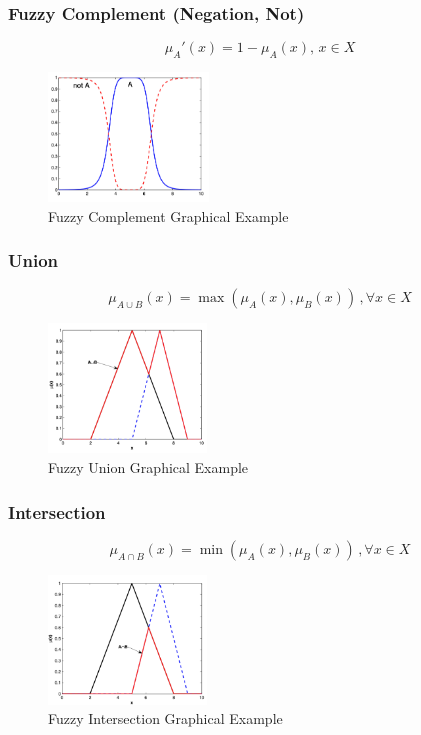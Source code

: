 \documentclass{tron}
\begin{document}
\subsubsection{Fuzzy Complement (Negation, Not)}
\begin{equation}
	\mu_A'(x) = 1 - \mu_A(x), \, x\in X
\end{equation}
\begin{figure}[H]
	\centering
	\includegraphics[height=130px]{Figs/Fuzzy/op-complement}
	\caption{Fuzzy Complement Graphical Example}
	\label{fig:fuzzy:complement:ex}
\end{figure}

\subsubsection{Union}
\begin{equation}
	\mu_{A \cup B}(x) = \max (\mu_A(x), \mu_B(x)) \,, \forall x \in X
\end{equation}
\begin{figure}[H]
	\centering
	\includegraphics[height=130px]{Figs/Fuzzy/op-union}
	\caption{Fuzzy Union Graphical Example}
	\label{fig:fuzzy:union:ex}
\end{figure}

\subsubsection{Intersection}
\begin{equation}
	\mu_{A \cap B}(x) = \min (\mu_A(x), \mu_B(x)) \,, \forall x \in X
\end{equation}
\begin{figure}[H]
	\centering
	\includegraphics[height=130px]{Figs/Fuzzy/op-intersection}
	\caption{Fuzzy Intersection Graphical Example}
	\label{fig:fuzzy:intersection:ex}
\end{figure}
\end{document}

